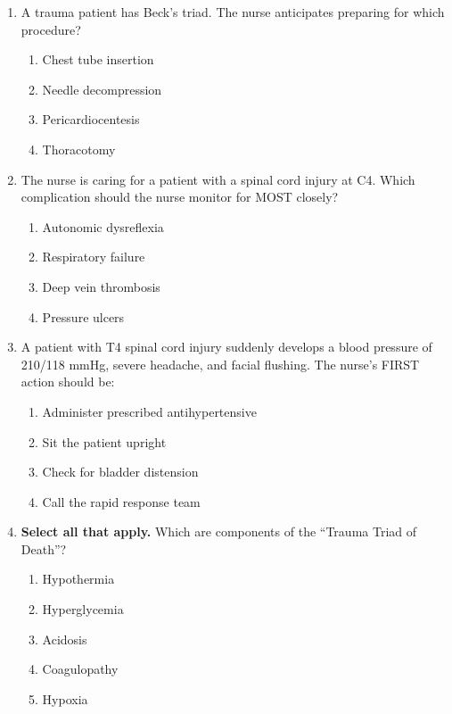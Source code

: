 \documentclass[11pt]{article}
\begin{document}
\begin{enumerate}
\item A trauma patient has Beck's triad. The nurse anticipates preparing for which procedure?

\begin{enumerate}[label=\Alph*.]
    \item Chest tube insertion
    \item Needle decompression
    \item Pericardiocentesis
    \item Thoracotomy
\end{enumerate}

\item The nurse is caring for a patient with a spinal cord injury at C4. Which complication should the nurse monitor for MOST closely?

\begin{enumerate}[label=\Alph*.]
    \item Autonomic dysreflexia
    \item Respiratory failure
    \item Deep vein thrombosis
    \item Pressure ulcers
\end{enumerate}

\item A patient with T4 spinal cord injury suddenly develops a blood pressure of 210/118 mmHg, severe headache, and facial flushing. The nurse's FIRST action should be:

\begin{enumerate}[label=\Alph*.]
    \item Administer prescribed antihypertensive
    \item Sit the patient upright
    \item Check for bladder distension
    \item Call the rapid response team
\end{enumerate}

\item \textbf{Select all that apply.} Which are components of the ``Trauma Triad of Death''?

\begin{enumerate}[label=\Alph*.]
    \item Hypothermia
    \item Hyperglycemia
    \item Acidosis
    \item Coagulopathy
    \item Hypoxia
\end{enumerate}


\end{enumerate}
\end{document}
